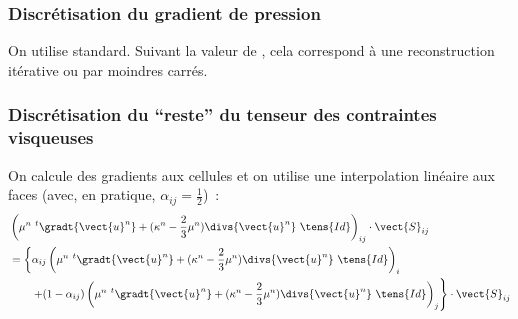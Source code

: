 \subsubsection*{Discrétisation du gradient de pression}

On utilise  standard. Suivant la valeur de ,
cela correspond à une reconstruction itérative ou par moindres carrés.

\subsubsection*{Discrétisation du ``reste'' du tenseur des contraintes visqueuses}

On calcule des gradients aux cellules et on utilise une
interpolation linéaire aux
faces (avec, en pratique, $\alpha_{ij}=\frac{1}{2}$)~:
\begin{equation}
\begin{aligned}
&\left(\mu^n\ ^t\gradt{\vect{u}^n} + (\kappa^n-\frac{2}{3}\mu^n)
\divs{\vect{u}^n}\ \tens{Id}\right)_{ij}\cdot\vect{S}_{ij}\\
&= \left\{\alpha_{ij} \left(\mu^n\ ^t\gradt{\vect{u}^n}
+ (\kappa^n-\frac{2}{3}\mu^n)\divs{\vect{u}^n}\ \tens{Id}\right)_i\right.\\
&\qquad\left.+ (1-\alpha_{ij}) \left(\mu^n\ ^t\gradt{\vect{u}^n}
+ (\kappa^n-\frac{2}{3}\mu^n)\divs{\vect{u}^n}\ \tens{Id}\right)_j
\right\} \cdot\vect{S}_{ij}
\end{aligned}
\end{equation}

